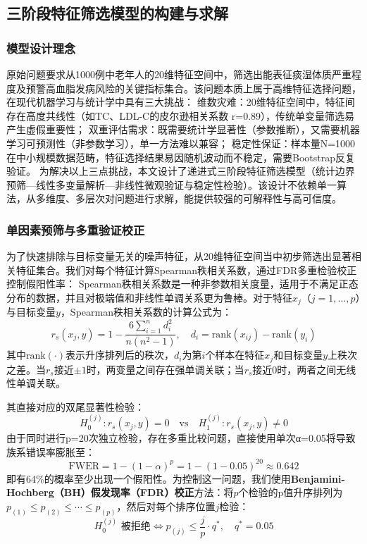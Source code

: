 \documentclass[12pt,a4paper]{ctexart}
\begin{document}
\subsection{三阶段特征筛选模型的构建与求解}
\subsubsection{模型设计理念}
原始问题要求从1000例中老年人的20维特征空间中，筛选出能表征痰湿体质严重程度及预警高血脂发病风险的关键指标集合。该问题本质上属于高维特征选择问题，在现代机器学习与统计学中具有三大挑战：
维数灾难：20维特征空间中，特征间存在高度共线性（如TC、LDL-C的皮尔逊相关系数 r=0.89），传统单变量筛选易产生虚假重要性；
双重评估需求：既需要统计学显著性（参数推断），又需要机器学习可预测性（非参数学习），单一方法难以兼容；
稳定性保证：样本量N=1000在中小规模数据范畴，特征选择结果易因随机波动而不稳定，需要Bootstrap反复验证。
为解决以上三点挑战，本文设计了递进式三阶段特征筛选模型（统计边界预筛—线性多变量解析—非线性微观验证与稳定性检验）。该设计不依赖单一算法，从多维度、多层次对问题进行求解，能提供较强的可解释性与高可信度。
\subsubsection{单因素预筛与多重验证校正}
为了快速排除与目标变量无关的噪声特征，从20维特征空间当中初步筛选出显著相关特征集合。我们对每个特征计算Spearman秩相关系数，通过FDR多重检验校正控制假阳性率：
Spearman秩相关系数是一种非参数相关度量，适用于不满足正态分布的数据，并且对极端值和非线性单调关系更为鲁棒。对于特征$x_j$（$j = 1, \ldots, p$）与目标变量$y$，Spearman秩相关系数的计算公式为：
\begin{equation}
r_s(x_j, y) = 1 - \frac{6\sum_{i=1}^{n}d_i^2}{n(n^2 - 1)}, \quad d_i = \text{rank}(x_{ij}) - \text{rank}(y_i)
\label{eq:spearman}
\end{equation}
其中$\text{rank}(\cdot)$表示升序排列后的秩次，$d_i$为第$i$个样本在特征$x_j$和目标变量$y$上秩次之差。当$r_s$接近$\pm 1$时，两变量之间存在强单调关联；当$r_s$接近0时，两者之间无线性单调关联。

其直接对应的双尾显著性检验：
\begin{equation}
    H_0^{(j)} : r_s(x_j, y) = 0 \quad \text{vs} \quad H_1^{(j)} : r_s(x_j, y) \neq 0
\end{equation}
由于同时进行p=20次独立检验，存在多重比较问题，直接使用单次α=0.05将导致族系错误率膨胀至：
\begin{equation}
    \text{FWER} = 1 - (1 - \alpha)^p = 1 - (1 - 0.05)^{20} \approx 0.642
\end{equation}
即有64\%的概率至少出现一个假阳性。为控制这一问题，我们使用\textbf{Benjamini-Hochberg（BH）假发现率（FDR）校正}方法：将$p$个检验的p值升序排列为$p_{(1)} \leq p_{(2)} \leq \cdots \leq p_{(p)}$，然后对每个排序位置$j$检验：
\begin{equation}
H_0^{(j)}\text{ 被拒绝} \iff p_{(j)} \leq \frac{j}{p} \cdot q^*, \quad q^* = 0.05
\label{eq:fdr}
\end{equation}
\end{document}
